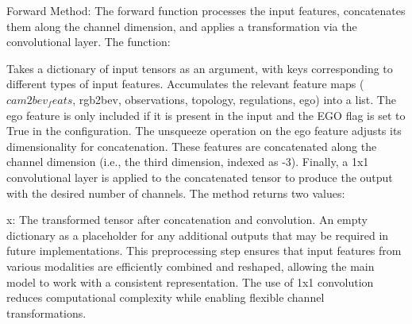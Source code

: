 Forward Method:
The forward function processes the input features, concatenates them along the channel dimension, and applies a transformation via the convolutional layer. The function:

Takes a dictionary of input tensors as an argument, with keys corresponding to different types of input features.
Accumulates the relevant feature maps ($cam2bev_feats$, rgb2bev, observations, topology, regulations, ego) into a list.
The ego feature is only included if it is present in the input and the EGO flag is set to True in the configuration. The unsqueeze operation on the ego feature adjusts its dimensionality for concatenation.
These features are concatenated along the channel dimension (i.e., the third dimension, indexed as -3).
Finally, a 1x1 convolutional layer is applied to the concatenated tensor to produce the output with the desired number of channels.
The method returns two values:

x: The transformed tensor after concatenation and convolution.
An empty dictionary {} as a placeholder for any additional outputs that may be required in future implementations.
This preprocessing step ensures that input features from various modalities are efficiently combined and reshaped, allowing the main model to work with a consistent representation. The use of 1x1 convolution reduces computational complexity while enabling flexible channel transformations.

